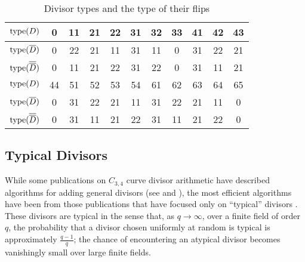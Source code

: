\begin{table}[h]
\label{tab_large_flip_type}
\begin{center}
  \begin{tabular}{r|cccccccccc}
    $\operatorname{type}(D)$             & 0 & 11 & 21 & 22 & 31 & 32 & 33 & 41 & 42 & 43 \\
    \hline
    $\operatorname{type}(\overline D)$        & 0 & 22 & 21 & 11 & 31 & 11 &  0 & 31 & 22 & 21 \\
    $\operatorname{type}(\overline {\overline D})$ & 0 & 11 & 21 & 22 & 31 & 22 &  0 & 31 & 11 & 21 \\
    \hline\hline
    $\operatorname{type}(D)$             & 44 & 51 & 52 & 53 & 54 & 61 & 62 & 63 & 64 & 65 \\
    \hline
    $\operatorname{type}(\overline D)$        &  0 & 31 & 22 & 21 & 11 & 31 & 22 & 21 & 11 &  0 \\
    $\operatorname{type}(\overline {\overline D})$ &  0 & 31 & 11 & 21 & 22 & 31 & 11 & 21 & 22 &  0 \\
  \end{tabular}
\end{center}
\caption{Divisor types and the type of their flips}
\end{table}



\subsection{Typical Divisors}

While some publications on $C_{3,4}$ curve divisor arithmetic have described algorithms for adding general divisors
(see \cite{arita05-2} and \cite{harasawa00}),
the most efficient algorithms have been from those publications that have focused only on ``typical'' divisors
\cite{salem07, kmakdisi18, flon08}.
These divisors are typical in the sense that, as $q \to \infty$,
over a finite field of order $q$,
the probability that a divisor chosen uniformly at random is typical is approximately $\frac {q - 1} q$;
the chance of encountering an atypical divisor becomes vanishingly small over large finite fields.

